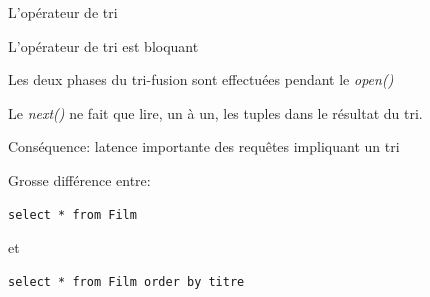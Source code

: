 \begin{frame}[fragile]{L'opérateur de tri}

L'opérateur de tri est \alert{bloquant}

\begin{redbullet}
  \item Les deux phases du tri-fusion sont effectuées pendant le \textit{open()}
  \item Le \textit{next()} ne fait que lire, un à un, les tuples dans le
     résultat du tri.
\end{redbullet}

\vfill

Conséquence: \alert{latence importante des requêtes impliquant un tri}

\vfill

Grosse différence entre:

\begin{verbatim}
select * from Film
\end{verbatim}
et
\begin{verbatim}
select * from Film order by titre
\end{verbatim}
\end{frame}


